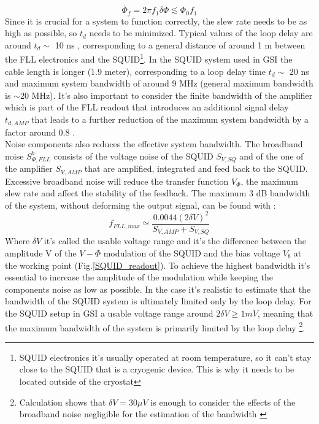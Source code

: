\documentclass[12pt,a4paper]{report}
\begin{document}
    \begin{equation}
    	 \dot{\Phi_f} = 2\pi f_1 \delta\Phi \lesssim \Phi_0 f_1 
    	 \label{Theoretical_slewrate}
    \end{equation}
    Since it is crucial for a system to function correctly, the slew rate needs to be as high as possible, so \(t_d\) needs to be minimized.
    Typical values of the loop delay are around $t_d\sim$ 10 ns \cite{Drung_article}, corresponding to a general distance of around 1 m between the FLL electronics and the SQUID\footnote{SQUID electronics it's usually operated at room temperature, so it can't stay close to the SQUID that is a cryogenic device. This is why it needs to be located outside of the cryostat}. In the SQUID system used in GSI the cable length is longer (1.9 meter), corresponding to a loop delay time $t_d\sim$ 20 ns and maximum system bandwidth of around 9 MHz (general maximum bandwidth is $\sim 20$ MHz). It's also important to consider the finite bandwidth of the amplifier which is part of the FLL readout that introduces an additional signal delay $t_{d,AMP}$ that leads to a further reduction of the maximum system bandwidth by a factor around 0.8 \cite{SQUID_book_2}. \\
    Noise components also reduces the effective system bandwidth. The broadband noise $S^b_{\Phi,FLL}$ consists of the voltage noise of the SQUID $S_{V,SQ}$ and of the one of the amplifier $S_{V,AMP}$ that are amplified, integrated and feed back to the SQUID.
    Excessive broadband noise will reduce the transfer function $V_\Phi$, the maximum slew rate and affect the stability of the feedback. The maximum 3 dB bandwidth of the system, without deforming the output signal, can be found with  \cite{Squid_handbook_1} \cite{SQUID_book_2}:
    \begin{equation}
    	f_{FLL,max} \simeq \frac{0.0044 (2\delta V)^2}{S_{V,AMP} + S_{V,SQ} }
    	\label{f_FLLmax}
    \end{equation}
    Where $\delta V$ it's called the usable voltage range and it's the difference between the amplitude V of the $V-\Phi$ modulation of the SQUID and the bias voltage $V_b$ at the working point (Fig.\ref{SQUID_readout}). To achieve the highest bandwidth it's essential to increase the amplitude of the modulation while keeping the components noise as low as possible. In the case it's realistic to estimate that the bandwidth of the SQUID system is ultimately limited only by the loop delay.
    For the SQUID setup in GSI a usable voltage range around $2\delta V \geq 1 mV$, meaning that the maximum bandwidth of the system is primarily limited by the loop delay \footnote{Calculation shows that $\delta V = 30 \mu V$ is enough to consider the effects of the broadband noise negligible for the estimation of the bandwidth \cite{Squid_handbook_1}}.
\end{document}
